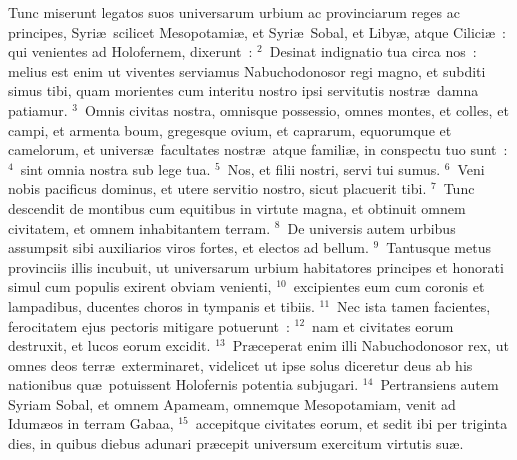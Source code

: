 \lettrine[lines=3,image=true,loversize=0.05,lraise=-0.03]{T}{}unc miserunt legatos suos universarum urbium ac provinciarum reges ac principes, Syri\ae\ scilicet Mesopotami\ae , et Syri\ae\ Sobal, et Liby\ae , atque Cilici\ae~: qui venientes ad Holofernem, dixerunt~:
${}^{2}$~Desinat indignatio tua circa nos~: melius est enim ut viventes serviamus Nabuchodonosor regi magno, et subditi simus tibi, quam morientes cum interitu nostro ipsi servitutis nostr\ae\ damna patiamur.
${}^{3}$~Omnis civitas nostra, omnisque possessio, omnes montes, et colles, et campi, et armenta boum, gregesque ovium, et caprarum, equorumque et camelorum, et univers\ae\ facultates nostr\ae\ atque famili\ae , in conspectu tuo sunt~:
${}^{4}$~sint omnia nostra sub lege tua.
${}^{5}$~Nos, et filii nostri, servi tui sumus.
${}^{6}$~Veni nobis pacificus dominus, et utere servitio nostro, sicut placuerit tibi.
${}^{7}$~Tunc descendit de montibus cum equitibus in virtute magna, et obtinuit omnem civitatem, et omnem inhabitantem terram.
${}^{8}$~De universis autem urbibus assumpsit sibi auxiliarios viros fortes, et electos ad bellum.
${}^{9}$~Tantusque metus provinciis illis incubuit, ut universarum urbium habitatores principes et honorati simul cum populis exirent obviam venienti,
${}^{10}$~excipientes eum cum coronis et lampadibus, ducentes choros in tympanis et tibiis.
${}^{11}$~Nec ista tamen facientes, ferocitatem ejus pectoris mitigare potuerunt~:
${}^{12}$~nam et civitates eorum destruxit, et lucos eorum excidit.
${}^{13}$~Pr\ae ceperat enim illi Nabuchodonosor rex, ut omnes deos terr\ae\ exterminaret, videlicet ut ipse solus diceretur deus ab his nationibus qu\ae\ potuissent Holofernis potentia subjugari.
${}^{14}$~Pertransiens autem Syriam Sobal, et omnem Apameam, omnemque Mesopotamiam, venit ad Idum\ae os in terram Gabaa,
${}^{15}$~accepitque civitates eorum, et sedit ibi per triginta dies, in quibus diebus adunari pr\ae cepit universum exercitum virtutis su\ae .

